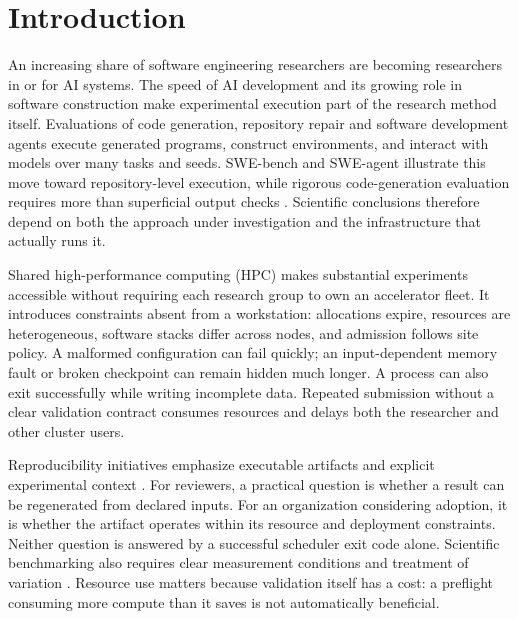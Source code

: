 \documentclass[pdflatex,sn-mathphys-num]{sn-jnl}
\theoremstyle{thmstylethree}
\begin{document}
\maketitle

\section{Introduction}\label{sec:introduction}
An increasing share of software engineering researchers are becoming researchers in or for AI systems. The speed of AI development and its growing role in software construction make experimental execution part of the research method itself. Evaluations of code generation, repository repair and software development agents execute generated programs, construct environments, and interact with models over many tasks and seeds. SWE-bench and SWE-agent illustrate this move toward repository-level execution, while rigorous code-generation evaluation requires more than superficial output checks \cite{jimenez2024swebench,yang2024sweagent,liu2023evalplus}. Scientific conclusions therefore depend on both the approach under investigation and the infrastructure that actually runs it.

Shared high-performance computing (HPC) makes substantial experiments accessible without requiring each research group to own an accelerator fleet. It introduces constraints absent from a workstation: allocations expire, resources are heterogeneous, software stacks differ across nodes, and admission follows site policy. A malformed configuration can fail quickly; an input-dependent memory fault or broken checkpoint can remain hidden much longer. A process can also exit successfully while writing incomplete data. Repeated submission without a clear validation contract consumes resources and delays both the researcher and other cluster users.

Reproducibility initiatives emphasize executable artifacts and explicit experimental context \cite{pineau2021improving,acm2020badges}. For reviewers, a practical question is whether a result can be regenerated from declared inputs. For an organization considering adoption, it is whether the artifact operates within its resource and deployment constraints. Neither question is answered by a successful scheduler exit code alone. Scientific benchmarking also requires clear measurement conditions and treatment of variation \cite{hoefler2015scientific}. Resource use matters because validation itself has a cost: a preflight consuming more compute than it saves is not automatically beneficial.
\end{document}
